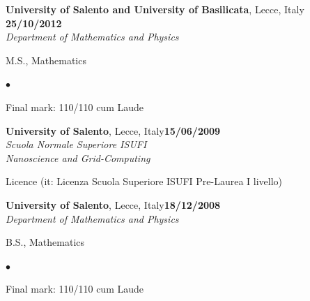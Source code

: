 \documentclass[margin,line]{res}
\newenvironment{list1}{
  \begin{list}{\ding{113}}{%
      \setlength{\itemsep}{0in}
      \setlength{\parsep}{0in} \setlength{\parskip}{0in}
      \setlength{\topsep}{0in} \setlength{\partopsep}{0in} 
      \setlength{\leftmargin}{0.17in}}}{\end{list}}
\newenvironment{list2}{
  \begin{list}{$\bullet$}{%
      \setlength{\itemsep}{-0in}
      \setlength{\parsep}{0in} \setlength{\parskip}{0in}
      \setlength{\topsep}{0in} \setlength{\partopsep}{0in} 
      \setlength{\leftmargin}{0.2in}}}{\end{list}}
\begin{document}
\begin{resume}
\vspace{-0.1in}
{\bf University of Salento and University of Basilicata}, Lecce, Italy \hfill {\bf 25/10/2012} \\
{\em Department of Mathematics and Physics} 
\begin{list1}
\item[] M.S., Mathematics
\begin{list2}
	\item[] Final mark: 110/110 cum Laude
\end{list2}
\end{list1}

\vspace{-0.1in}
{\bf University of Salento}, Lecce, Italy\hfill {\bf  15/06/2009}\\
{\em Scuola Normale Superiore ISUFI}\\
{\em Nanoscience and Grid-Computing}
\begin{list1}
	\item[] Licence (it: Licenza Scuola Superiore ISUFI Pre-Laurea I livello)
\end{list1}

\vspace{-0.1in}
{\bf University of Salento}, Lecce, Italy\hfill {\bf  18/12/2008} \\
{\em Department of Mathematics and Physics} 
\begin{list1}
\item[] B.S., Mathematics 
\begin{list2}
	\item[] Final mark: 110/110 cum Laude
\end{list2}
\end{list1}






\end{resume}
\end{document}
